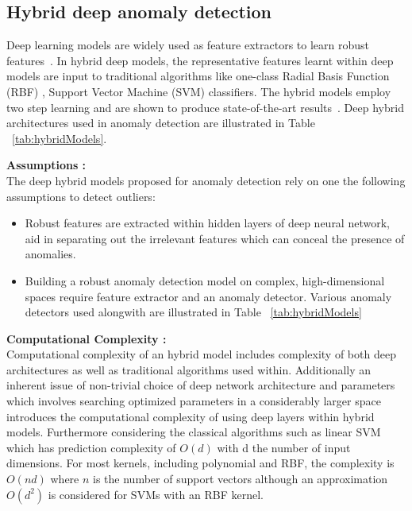 \subsection{Hybrid deep anomaly detection}
\label{sec:hybridModels}
Deep learning models are widely used as feature extractors to learn robust features~\cite{andrews2016detecting}. In hybrid deep models, the representative features learnt within deep models are input to traditional algorithms like one-class Radial Basis Function (RBF) , Support Vector Machine (SVM) classifiers. The hybrid models employ two step learning and are shown to produce state-of-the-art results~\cite{erfani2016high,erfani2016robust,wu2015harvesting}.  Deep hybrid architectures used in anomaly detection are illustrated in Table ~\ref{tab:hybridModels}.





\textbf{Assumptions : } \\
The deep hybrid models proposed for anomaly detection rely on one the following assumptions to detect outliers:
\begin{itemize}
  \item Robust features are extracted within hidden layers of deep neural network, aid in separating out the irrelevant features which can conceal the presence of anomalies.
  \item Building a robust anomaly detection model on complex, high-dimensional spaces require feature extractor and an anomaly detector. Various anomaly detectors used alongwith are illustrated in Table ~\ref{tab:hybridModels}
\end{itemize}

\textbf{Computational Complexity :} \\
Computational complexity of an hybrid model includes complexity of both deep architectures as well as traditional algorithms used within.  Additionally  an inherent issue of non-trivial choice of deep network architecture and parameters which involves searching optimized parameters in a considerably larger space introduces the computational complexity of using deep layers within hybrid models. Furthermore considering the classical algorithms such as  linear SVM which has prediction complexity  of $O(d)$ with d the number of input dimensions. For most kernels, including polynomial and RBF, the complexity is $O(nd)$ where $n$ is the number of support vectors although an approximation $O(d^2)$ is considered for SVMs with an RBF kernel.

